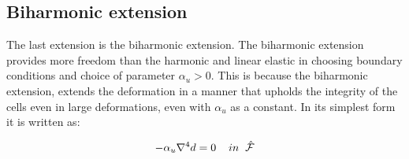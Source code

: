\subsection{Biharmonic extension} 
The last extension is the biharmonic extension. The biharmonic extension provides more freedom than the harmonic and linear elastic in choosing boundary conditions and choice of parameter $\alpha_u > 0$. This is because the biharmonic extension, extends the deformation in a manner that upholds the integrity of the cells even in large deformations, even with $\alpha_u$ as a constant. In its simplest form it is written as:

\begin{equation}
- \alpha_u \nabla^4 d = 0 \hspace{4mm}  in \hspace{2mm} \hat{\mathcal{F}}\\
\end{equation}


